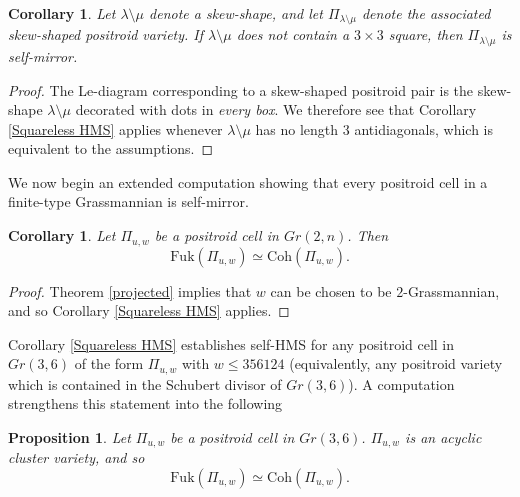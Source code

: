 \documentclass[11pt]{amsart}
\newtheorem{cor}[thm]{Corollary}
\newtheorem{prop}[thm]{Proposition}
\theoremstyle{definition}
\theoremstyle{remark}
\newcommand{\Coh}{\mathrm{Coh}}
\newcommand{\Fuk}{\mathrm{Fuk}}
\numberwithin{equation}{section}
\begin{document}
\begin{cor}\label{Skew Squareless}
    Let $\lambda \setminus \mu$ denote a skew-shape, and let $\Pi_{\lambda \setminus \mu}$ denote the associated skew-shaped positroid variety. If $\lambda \setminus \mu$ does not contain a $3 \times 3$ square, then $\Pi_{\lambda \setminus \mu}$ is self-mirror.
\end{cor}

\begin{proof}
    The Le-diagram corresponding to a skew-shaped positroid pair is the skew-shape $\lambda \setminus \mu$ decorated with dots in \textit{every box}. We therefore see that Corollary \ref{Squareless HMS} applies whenever $\lambda \setminus \mu$ has no length $3$ antidiagonals, which is equivalent to the assumptions.
\end{proof}

We now begin an extended computation showing that every positroid cell in a finite-type Grassmannian is self-mirror.

\begin{cor}
    Let $\Pi_{u,w}$ be a positroid cell in $Gr(2, n)$. Then $$\Fuk(\Pi_{u,w}) \simeq \Coh(\Pi_{u,w}).$$ 
\end{cor}

\begin{proof}
    Theorem \ref{projected} implies that $w$ can be chosen to be $2$-Grassmannian, and so Corollary \ref{Squareless HMS} applies.
\end{proof}

Corollary \ref{Squareless HMS} establishes self-HMS for any positroid cell in $Gr(3,6)$ of the form $\Pi_{u,w}$ with $w \leq 356124$ (equivalently, any positroid variety which is contained in the Schubert divisor of $Gr(3,6)$). A computation strengthens this statement into the following

\begin{prop}\label{3,6 acyclic}
    Let $\Pi_{u,w}$ be a positroid cell in $Gr(3,6)$. $\Pi_{u,w}$ is an acyclic cluster variety, and so $$\Fuk(\Pi_{u,w}) \simeq \Coh(\Pi_{u,w}).$$
\end{prop}
    
\end{document}
